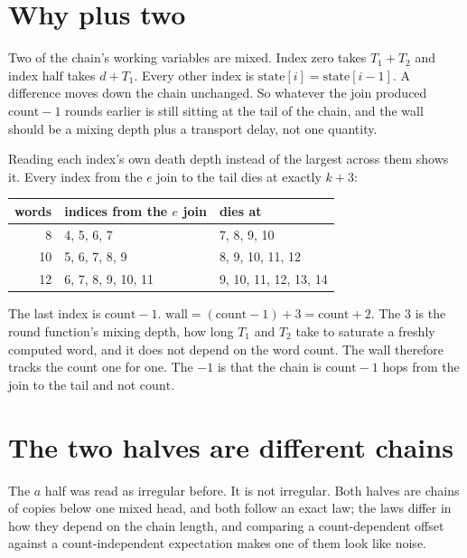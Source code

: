 \section{Why plus two}

Two of the chain's working variables are mixed. Index zero takes \(T_1 + T_2\) and index \(\mathrm{half}\) takes \(d + T_1\). Every other index is \(\mathrm{state}[i] = \mathrm{state}[i-1]\). A difference moves down the chain unchanged. So whatever the join produced \(\mathrm{count} - 1\) rounds earlier is still sitting at the tail of the chain, and the wall should be a mixing depth plus a transport delay, not one quantity.

Reading each index's own death depth instead of the largest across them shows it. Every index from the \(e\) join to the tail dies at exactly \(k + 3\):

\begin{center}
\begin{tabular}{rll}
\toprule
words & indices from the \(e\) join & dies at \\
\midrule
8 & 4, 5, 6, 7 & 7, 8, 9, 10 \\
10 & 5, 6, 7, 8, 9 & 8, 9, 10, 11, 12 \\
12 & 6, 7, 8, 9, 10, 11 & 9, 10, 11, 12, 13, 14 \\
\bottomrule
\end{tabular}
\end{center}

The last index is \(\mathrm{count} - 1\). \(\mathrm{wall} = (\mathrm{count} - 1) + 3 = \mathrm{count} + 2\). The \(3\) is the round function's mixing depth, how long \(T_1\) and \(T_2\) take to saturate a freshly computed word, and it does not depend on the word count. The wall therefore tracks the count one for one. The \(-1\) is that the chain is \(\mathrm{count} - 1\) hops from the join to the tail and not \(\mathrm{count}\).

\section{The two halves are different chains}

The \(a\) half was read as irregular before. It is not irregular. Both halves are chains of copies below one mixed head, and both follow an exact law; the laws differ in how they depend on the chain length, and comparing a count-dependent offset against a count-independent expectation makes one of them look like noise.

